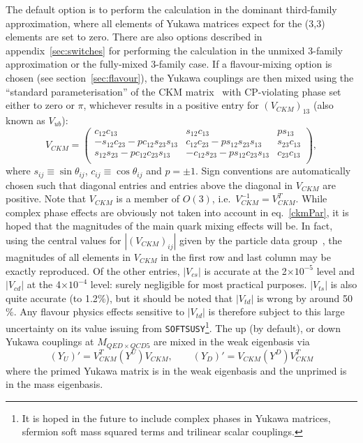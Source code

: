 \documentclass{article}
\begin{document}
The default option is to perform the calculation in the 
dominant third-family approximation, where all elements of Yukawa matrices
expect for the (3,3) elements are set to zero.
There are also options described in
appendix~\ref{sec:switches} for performing the calculation in the unmixed
3-family approximation or the fully-mixed 3-family case.
If a flavour-mixing option is chosen (see section~\ref{sec:flavour}),
the Yukawa couplings are then mixed using the ``standard parameterisation''
of the CKM matrix~\cite{Groom:2000in} with CP-violating phase set either to
zero or $\pi$, whichever results in a positive entry for $(V_{CKM})_{13}$
(also known as $V_{ub}$):
\begin{equation}
V_{CKM} = \left( \begin{array} {ccc}
c_{12} c_{13}   & s_{12} c_{13}   & p s_{13} \\
-s_{12} c_{23} -p c_{12} s_{23} s_{13} & c_{12} c_{23} -p s_{12} s_{23} s_{13} & 
s_{23} c_{13} \\
s_{12} s_{23} - p c_{12} c_{23} s_{13} & -c_{12} s_{23} - p s_{12} c_{23} s_{13} &
c_{23} c_{13} \\
\end{array} \right), \label{ckmPar}
\end{equation}
where $s_{ij}\equiv \sin \theta_{ij}$, $c_{ij}\equiv \cos \theta_{ij}$ and
$p=\pm 1$. Sign conventions are automatically chosen such that diagonal entries and entries
above the diagonal in $V_{CKM}$ are positive. Note that $V_{CKM}$ is a member
of $O(3)$, i.e.\ $V_{CKM}^{-1}= V_{CKM}^T$.
While complex phase effects are obviously not taken into account in
eq.~\ref{ckmPar}, it is hoped that the magnitudes of the main quark mixing
effects will be. In fact, using the central values for $|(V_{CKM})_{ij}|$
given by 
the particle data group~\cite{Groom:2000in}, the magnitudes of all elements in
$V_{CKM}$ in the 
first row and last column may be exactly reproduced. Of the other entries, 
$|V_{cs}|$ is accurate at the 2$\times 10^{-5}$ level and
$|V_{cd}|$ at the 4$\times 10^{-4}$ level: surely negligible for most practical
purposes. $|V_{ts}|$ is also quite accurate (to 1.2$\%$), but 
it should be noted that $|V_{td}|$ is wrong by around 50$\%$. Any
flavour physics effects sensitive to $|V_{td}|$ is therefore subject to
this large uncertainty on its value issuing from {\tt SOFTSUSY}\footnote{It is
  hoped 
in the future to include complex phases in Yukawa matrices,
sfermion soft mass squared terms and trilinear scalar couplings.}.
The up (by default), or down Yukawa couplings at $M_{QED \times QCD5}$ are mixed in the
weak eigenbasis via
\begin{equation}
(Y_U)'=V_{CKM}^T (Y^U) V_{CKM}, \qquad 
(Y_D)'=V_{CKM} (Y^D) V_{CKM}^T \label{ckm}
\end{equation}
where the primed Yukawa matrix is in the weak eigenbasis and the unprimed is
in the mass eigenbasis. 
\end{document}
